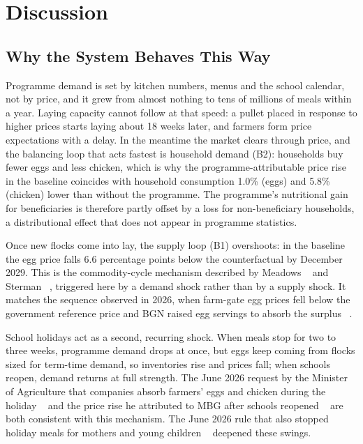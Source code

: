 \documentclass[10pt,twocolumn,a4paper]{article}
\begin{document}
\section{Discussion}\label{sec:discussion}

\subsection{Why the System Behaves This Way}

Programme demand is set by kitchen numbers, menus and the school calendar, not by price, and it grew from almost nothing to tens of millions of meals within a year. Laying capacity cannot follow at that speed: a pullet placed in response to higher prices starts laying about 18 weeks later, and farmers form price expectations with a delay. In the meantime the market clears through price, and the balancing loop that acts fastest is household demand (B2): households buy fewer eggs and less chicken, which is why the programme-attributable price rise in the baseline coincides with household consumption 1.0\% (eggs) and 5.8\% (chicken) lower than without the programme. The programme's nutritional gain for beneficiaries is therefore partly offset by a loss for non-beneficiary households, a distributional effect that does not appear in programme statistics.


Once new flocks come into lay, the supply loop (B1) overshoots: in the baseline the egg price falls 6.6 percentage points below the counterfactual by December 2029. This is the commodity-cycle mechanism described by Meadows ~\cite{meadows1970} and Sterman ~\cite{sterman2000}, triggered here by a demand shock rather than by a supply shock. It matches the sequence observed in 2026, when farm-gate egg prices fell below the government reference price and BGN raised egg servings to absorb the surplus ~\cite{egg3x2026}.


School holidays act as a second, recurring shock. When meals stop for two to three weeks, programme demand drops at once, but eggs keep coming from flocks sized for term-time demand, so inventories rise and prices fall; when schools reopen, demand returns at full strength. The June 2026 request by the Minister of Agriculture that companies absorb farmers' eggs and chicken during the holiday ~\cite{amran2026} and the price rise he attributed to MBG after schools reopened ~\cite{okezone2026} are both consistent with this mechanism. The June 2026 rule that also stopped holiday meals for mothers and young children ~\cite{holiday2026} deepened these swings.
\end{document}

